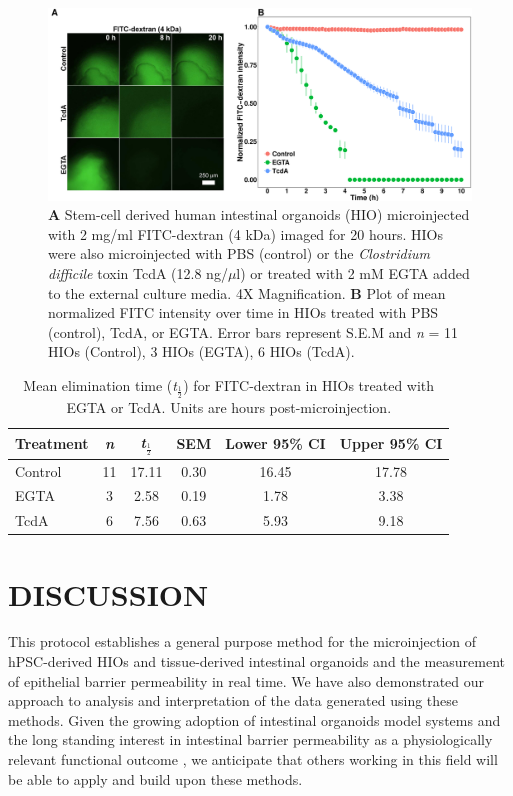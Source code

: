 \documentclass[11pt]{article}
\begin{document}
\begin{figure}
\includegraphics[width=0.95\linewidth]{./results/figure4.pdf}
\caption{\textbf{A} Stem-cell derived human intestinal organoids (HIO) microinjected with 2 mg/ml FITC-dextran (4 kDa) imaged for 20 hours. HIOs were also microinjected with PBS (control) or the \textit{Clostridium difficile} toxin TcdA (12.8 ng/$\mu$l) or treated with 2 mM EGTA added to the external culture media. 4X Magnification. \textbf{B} Plot of mean normalized FITC intensity over time in HIOs treated with PBS (control), TcdA, or EGTA. Error bars represent S.E.M and \textit{n} = 11 HIOs (Control), 3 HIOs (EGTA), 6 HIOs (TcdA).}
\end{figure}

\begin{table}[ht]
\centering
\begin{tabular}{l|ccccc}
{\bf Treatment} & {\bf \textit{n}} & {\bf \textit{t}$_\frac{1}{2}$} & {\bf SEM} & {\bf Lower 95\% CI} & {\bf Upper 95\% CI} \\ 
\hline
Control &  11 & 17.11  & 0.30 & 16.45 & 17.78 \\ 
EGTA  &   3 & 2.58 & 0.19 & 1.78 & 3.38 \\ 
TcdA &   6 & 7.56  & 0.63 & 5.93 & 9.18 \\ 
\end{tabular}
\caption{Mean elimination time (\textit{t}$_\frac{1}{2}$) for FITC-dextran in HIOs treated with EGTA or TcdA. Units are hours post-microinjection.}
\end{table}


\section*{DISCUSSION}
This protocol establishes a general purpose method for the microinjection of hPSC-derived HIOs and tissue-derived intestinal organoids and the measurement of epithelial barrier permeability in real time. We have also demonstrated our approach to analysis and interpretation of the data generated using these methods. Given the growing adoption of intestinal organoids model systems \supercite{Clevers:2016,Hill:2017,Aurora:2016,Dedhia:2016} and the long standing interest in intestinal barrier permeability as a physiologically relevant functional outcome \supercite{Clayburgh:2004,Turner:2009,Bischoff:2014,Odenwald:2017}, we anticipate that others working in this field will be able to apply and build upon these methods.\\
\end{document}

